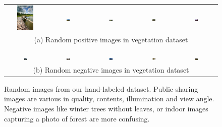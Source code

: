 \begin{figure}[th]
{\small{
\begin{center}
\begin{tabular}{@{}c@{\,\,\,}c@{\,\,\,}c@{\,\,\,}c@{\,\,\,}c@{\,\,\,}}
\vspace{10pt}
\includegraphics[height=0.5in]{imggrid/datasetposi/6.jpg} &
\includegraphics[width=0.08\textwidth]{imggrid/datasetposi/7.jpg} &
\includegraphics[width=0.08\textwidth]{imggrid/datasetposi/8.jpg} &
\includegraphics[width=0.08\textwidth]{imggrid/datasetposi/9.jpg} &
\includegraphics[width=0.08\textwidth]{imggrid/datasetposi/10.jpg} \\
\multicolumn{5}{c}{(a) Random positive images in vegetation dataset} \\
\\[-6pt]
\hline
\\[-6pt]
\includegraphics[width=0.08\textwidth]{imggrid/datasetnega/1.jpg} &
\includegraphics[width=0.08\textwidth]{imggrid/datasetnega/2.jpg} &
\includegraphics[width=0.08\textwidth]{imggrid/datasetnega/7.jpg} &
\includegraphics[width=0.08\textwidth]{imggrid/datasetnega/8.jpg} &
\includegraphics[width=0.08\textwidth]{imggrid/datasetnega/10.jpg} \\
\multicolumn{5}{c}{(b) Random negative images in vegetation dataset} \\
\end{tabular}
\end{center}
}}
\caption{Random images from our hand-labeled dataset. Public sharing images are various in quality, contents, illumination and view angle.
Negative images like winter trees without leaves, or indoor images capturing a photo of forest are more confusing.}
\label{fig:dataset}
\end{figure}

